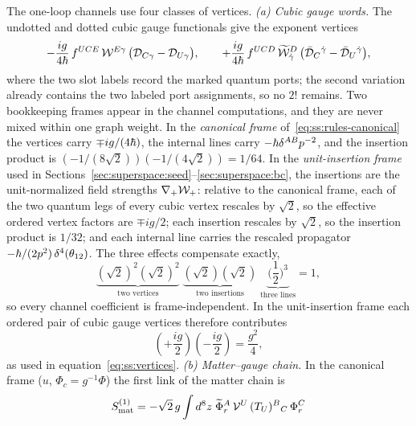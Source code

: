 The one-loop channels use four classes of vertices.
\emph{(a) Cubic gauge words.} The undotted and dotted cubic gauge functionals give the exponent vertices
\begin{equation}\label{eq:ss:rules-hessians}
-\frac{ig}{4\hbar}\,f^{UCE}\,\mathcal{W}^{E\gamma}\,
\big(\mathcal{D}_{C\gamma}-\mathcal{D}_{U\gamma}\big),
\qquad
+\frac{ig}{4\hbar}\,f^{UCD}\,\widetilde{\mathcal{W}}^{D}_{\dot\gamma}\,
\big(\bar{\mathcal{D}}_{C}{}^{\dot\gamma}-\bar{\mathcal{D}}_{U}{}^{\dot\gamma}\big) ,
\end{equation}
where the two slot labels record the marked quantum ports; the second variation already contains the two labeled port assignments, so no $2!$ remains. Two bookkeeping frames appear in the channel computations, and they are never mixed within one graph weight. In the \emph{canonical frame} of~\eqref{eq:ss:rules-canonical} the vertices carry $\mp ig/(4\hbar)$, the internal lines carry $-\hbar\delta^{AB}p^{-2}$, and the insertion product is $(-1/(8\sqrt2))(-1/(4\sqrt2))=1/64$. In the \emph{unit-insertion frame} used in Sections~\ref{sec:superspace:seed}--\ref{sec:superspace:bc}, the insertions are the unit-normalized field strengths $\nabla_{+}\mathcal{W}_{+}$: relative to the canonical frame, each of the two quantum legs of every cubic vertex rescales by $\sqrt2$, so the effective ordered vertex factors are $\mp ig/2$; each insertion rescales by $\sqrt2$, so the insertion product is $1/32$; and each internal line carries the rescaled propagator $-\hbar/(2p^{2})\,\delta^{4}(\theta_{12})$. The three effects compensate exactly,
\begin{equation}\label{eq:ss:rules-framecomp}
\underbrace{(\sqrt2)^{2}(\sqrt2)^{2}}_{\text{two vertices}}\;
\underbrace{(\sqrt2)(\sqrt2)}_{\text{two insertions}}\;
\underbrace{\Big(\frac12\Big)^{3}}_{\text{three lines}}
=1 ,
\end{equation}
so every channel coefficient is frame-independent. In the unit-insertion frame each ordered pair of cubic gauge vertices therefore contributes
\begin{equation}\label{eq:ss:rules-gaugepair}
\left(+\frac{ig}{2}\right)\left(-\frac{ig}{2}\right)=\frac{g^{2}}{4} ,
\end{equation}
as used in equation~\eqref{eq:ss:vertices}.
\emph{(b) Matter--gauge chain.} In the canonical frame ($u$, $\Phi_{c}=g^{-1}\Phi$) the first link of the matter chain is
\begin{equation}\label{eq:ss:rules-mattervertex}
S^{(1)}_{\mathrm{mat}}
=-\sqrt2\,g\int d^{8}z\;
\widetilde\Phi_{r}^{A}\,\mathcal{V}^{U}\,(T_{U})^{B}{}_{C}\,\Phi_{r}^{C}
\end{equation}
